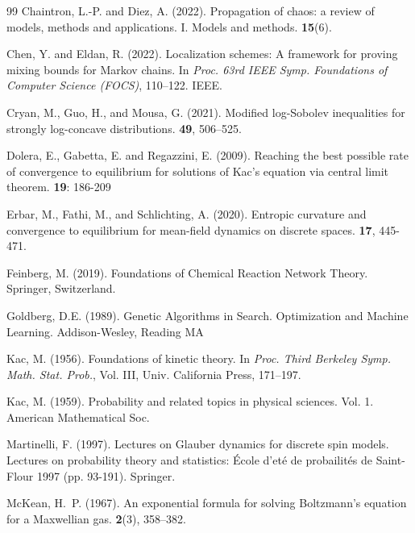 \documentclass[11pt,reqno]{amsart}
\numberwithin{equation}{section}
\numberwithin{figure}{section}
\newcommand{\1}{\mathds{1}}
\begin{document}
\begin{thebibliography}{99}
Chaintron, L.-P. and Diez, A. (2022).
\newblock Propagation of chaos: a review of models, methods and applications. I. Models and methods.
 {\bf 15}(6).


Chen, Y. and Eldan, R. (2022).
\newblock Localization schemes: A framework for proving mixing bounds for Markov chains.
\newblock In {\em Proc. 63rd IEEE Symp. Foundations of Computer Science (FOCS)}, 110--122. IEEE.


Cryan, M., Guo, H., and Mousa, G. (2021).
\newblock Modified log-Sobolev inequalities for strongly log-concave distributions.
 {\bf 49}, 506--525.


Dolera, E., Gabetta, E. and Regazzini, E. (2009).
\newblock Reaching the best possible rate of convergence to equilibrium
for solutions of Kac's equation via central limit theorem. 
 {\bf 19}: 186-209

Erbar, M., Fathi, M., and Schlichting, A. (2020). 
\newblock Entropic curvature and convergence to equilibrium for mean-field dynamics on discrete spaces. 
 {\bf 17}, 445-471.




 Feinberg, M. (2019).
 \newblock Foundations of Chemical Reaction Network Theory. 
 \newblock Springer, Switzerland.
 
 
 Goldberg, D.E. (1989). 
 \newblock Genetic Algorithms in Search. Optimization and Machine Learning. 
 \newblock Addison-Wesley, Reading MA 
 
Kac, M. (1956).
\newblock Foundations of kinetic theory.
\newblock In {\em Proc. Third Berkeley Symp. Math. Stat. Prob.}, Vol. III, Univ. California Press, 171--197.

Kac, M. (1959).
\newblock Probability and related topics in physical sciences. 
\newblock Vol. 1. American Mathematical Soc.

Martinelli, F. (1997). 
\newblock Lectures on Glauber dynamics for discrete spin models. 
\newblock Lectures on probability theory and statistics: \'Ecole d'et\'e de probailit\'es de Saint-Flour 1997 (pp. 93-191). Springer.

McKean, H.~P. (1967).
\newblock An exponential formula for solving Boltzmann's equation for a Maxwellian gas.
 {\bf 2}(3), 358--382.


\end{thebibliography}
\end{document}
